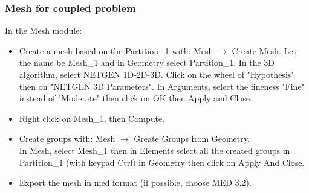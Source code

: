 \documentclass[10pt, hyperref={unicode=true,pdfusetitle, bookmarks=true,bookmarksnumbered=false,bookmarksopen=false, breaklinks=false,pdfborder={0 0 1},backref=true,colorlinks=true,linkcolor=darkblue,pageanchor}]{beamer}
\begin{document}
\begin{frame}
\frametitle{Mesh for coupled problem}

\begin{block}{In the Mesh module:}
\begin{itemize} 

 \item Create a mesh based on the Partition\_1 with: Mesh $\rightarrow$ Create Mesh. Let the name be Mesh\_1 and in Geometry select Partition\_1. In the 3D algorithm, select NETGEN 1D-2D-3D. Click on the wheel of "Hypothesis" then on "NETGEN 3D Parameters". In Arguments, select the fineness "Fine" instead of "Moderate" then click on OK then Apply and Close.
 
 \item Right click on Mesh\_1, then Compute.
 
 \item Create groups with: Mesh $\rightarrow$ Greate Groups from Geometry. \\
 In Mesh, select Mesh\_1 then in Elements select all the created groups in Partition\_1 (with keypad Ctrl) in Geometry then click on Apply And Close.

 \item Export the mesh in med format (if possible, choose MED 3.2).
 
\end{itemize}
\end{block}

\end{frame}
\end{document}
